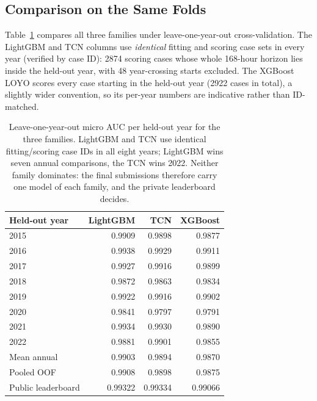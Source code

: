\documentclass{article}
\begin{document}
\subsection{Comparison on the Same Folds}
\label{sec:comparison}

Table~\ref{tab:loyocompare} compares all three families under
leave-one-year-out cross-validation. The LightGBM and TCN columns use
\emph{identical} fitting and scoring case sets in every year (verified by
case ID): 2874 scoring cases whose whole 168-hour horizon lies inside the
held-out year, with 48 year-crossing starts excluded. The XGBoost LOYO
scores every case starting in the held-out year (2922 cases in total), a
slightly wider convention, so its per-year numbers are indicative rather
than ID-matched.

\begin{table}[h]
    \centering
    \begin{tabular}{lrrr}
        \hline
        Held-out year & LightGBM & TCN & XGBoost \\
        \hline
        2015 & 0.9909 & 0.9898 & 0.9877 \\
        2016 & 0.9938 & 0.9929 & 0.9911 \\
        2017 & 0.9927 & 0.9916 & 0.9899 \\
        2018 & 0.9872 & 0.9863 & 0.9834 \\
        2019 & 0.9922 & 0.9916 & 0.9902 \\
        2020 & 0.9841 & 0.9797 & 0.9791 \\
        2021 & 0.9934 & 0.9930 & 0.9890 \\
        2022 & 0.9881 & 0.9901 & 0.9855 \\
        \hline
        Mean annual & 0.9903 & 0.9894 & 0.9870 \\
        Pooled OOF & 0.9908 & 0.9898 & 0.9875 \\
        Public leaderboard & 0.99322 & 0.99334 & 0.99066 \\
        \hline
    \end{tabular}
    \caption{Leave-one-year-out micro AUC per held-out year for the
    three families. LightGBM and TCN use identical fitting/scoring case
    IDs in all eight years; LightGBM wins seven annual comparisons, the
    TCN wins 2022. Neither family dominates: the final submissions
    therefore carry one model of each family, and the private leaderboard
    decides.}
    \label{tab:loyocompare}
\end{table}
\end{document}
